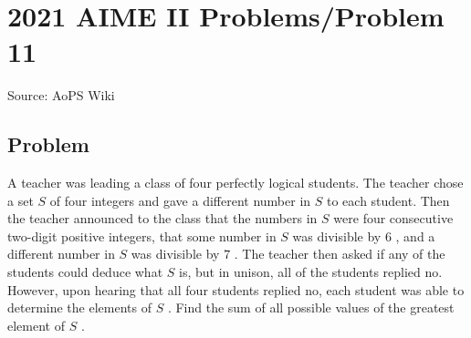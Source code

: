 \documentclass[12pt]{article}
\begin{document}
\section*{{2021 AIME II Problems/Problem 11}}
Source: AoPS Wiki

\subsection*{Problem}
A teacher was leading a class of four perfectly logical students. The teacher chose a set $S$ of four integers and gave a different number in $S$ to each student. Then the teacher announced to the class that the numbers in $S$ were four consecutive two-digit positive integers, that some number in $S$ was divisible by $6$ , and a different number in $S$ was divisible by $7$ . The teacher then asked if any of the students could deduce what $S$ is, but in unison, all of the students replied no. However, upon hearing that all four students replied no, each student was able to determine the elements of $S$ . Find the sum of all possible values of the greatest element of $S$ .
\end{document}
